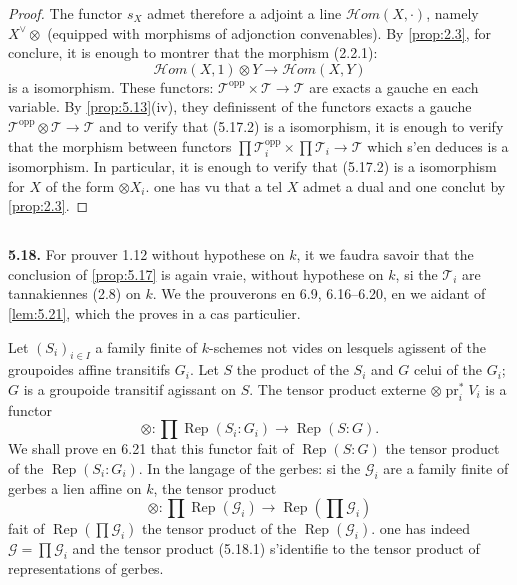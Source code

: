 \documentclass[12pt,a4paper]{article}
\theoremstyle{plain}
\theoremstyle{definition}
\theoremstyle{remark}
\DeclareMathOperator{\pr}{pr}
\DeclareMathOperator{\Rep}{Rep}
\begin{document}
\begin{proof}
The functor $s_X$ admet therefore a adjoint a line $\mathcal{H}om(X,\cdot)$, namely $X^\vee \otimes$ (equipped with morphisms of adjonction convenables). By \ref{prop:2.3}, for conclure, it is enough to montrer that the morphism (2.2.1):
\begin{equation}\label{eq:5.17.2}
\mathcal{H}om(X,1) \otimes Y \to \mathcal{H}om(X,Y)
\end{equation}
is a isomorphism. These functors: $\mathcal{T}^\mathrm{opp} \times \mathcal{T} \to \mathcal{T}$ are exacts a gauche en each variable. By \ref{prop:5.13}(iv), they definissent of the functors exacts a gauche $\mathcal{T}^\mathrm{opp} \otimes \mathcal{T} \to \mathcal{T}$ and to verify that (5.17.2) is a isomorphism, it is enough to verify that the morphism between functors $\prod \mathcal{T}_i^\mathrm{opp} \times \prod \mathcal{T}_i \to \mathcal{T}$ which s'en deduces is a isomorphism. In particular, it is enough to verify that (5.17.2) is a isomorphism for $X$ of the form $\otimes X_i$. one has vu that a tel $X$ admet a dual and one conclut by \ref{prop:2.3}.
\end{proof}

\subsection{}

\textbf{5.18.} For prouver 1.12 without hypothese on $k$, it we faudra savoir that the conclusion of \ref{prop:5.17} is again vraie, without hypothese on $k$, si the $\mathcal{T}_i$ are tannakiennes (2.8) on $k$. We the prouverons en 6.9, 6.16--6.20, en we aidant of \ref{lem:5.21}, which the proves in a cas particulier.

Let $(S_i)_{i \in I}$ a family finite of $k$-schemes not vides on lesquels agissent of the groupoides affine transitifs $G_i$. Let $S$ the product of the $S_i$ and $G$ celui of the $G_i$; $G$ is a groupoide transitif agissant on $S$. The tensor product externe $\otimes \pr_i^* V_i$ is a functor
\begin{equation}\label{eq:5.18.1}
\otimes : \prod \Rep(S_i : G_i) \longrightarrow \Rep(S : G).
\end{equation}
We shall prove en 6.21 that this functor fait of $\Rep(S:G)$ the tensor product of the $\Rep(S_i:G_i)$. In the langage of the gerbes: si the $\mathcal{G}_i$ are a family finite of gerbes a lien affine on $k$, the tensor product
\[
\otimes : \prod \Rep(\mathcal{G}_i) \to \Rep(\prod \mathcal{G}_i)
\]
fait of $\Rep(\prod \mathcal{G}_i)$ the tensor product of the $\Rep(\mathcal{G}_i)$. one has indeed $\mathcal{G} = \prod \mathcal{G}_i$ and the tensor product (5.18.1) s'identifie to the tensor product of representations of gerbes.
\end{document}
